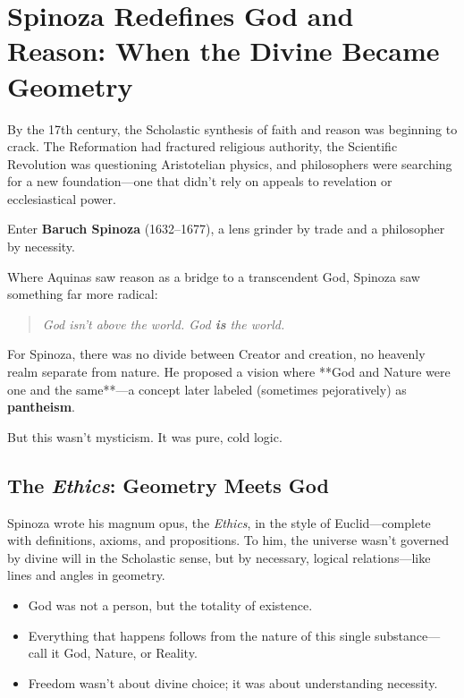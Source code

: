 \section{Spinoza Redefines God and Reason: When the Divine Became Geometry}

By the 17th century, the Scholastic synthesis of faith and reason was beginning to crack. The Reformation had fractured religious authority, the Scientific Revolution was questioning Aristotelian physics, and philosophers were searching for a new foundation—one that didn’t rely on appeals to revelation or ecclesiastical power.

Enter \textbf{Baruch Spinoza} (1632–1677), a lens grinder by trade and a philosopher by necessity.

Where Aquinas saw reason as a bridge to a transcendent God, Spinoza saw something far more radical:

\begin{quote}
\textit{God isn’t above the world. God \textbf{is} the world.}
\end{quote}

For Spinoza, there was no divide between Creator and creation, no heavenly realm separate from nature. He proposed a vision where **God and Nature were one and the same**—a concept later labeled (sometimes pejoratively) as \textbf{pantheism}.

But this wasn’t mysticism. It was pure, cold logic.

\subsection*{The \textit{Ethics}: Geometry Meets God}

Spinoza wrote his magnum opus, the \textit{Ethics}, in the style of Euclid—complete with definitions, axioms, and propositions. To him, the universe wasn’t governed by divine will in the Scholastic sense, but by necessary, logical relations—like lines and angles in geometry.

\begin{itemize}
    \item God was not a person, but the totality of existence.
    \item Everything that happens follows from the nature of this single substance—call it God, Nature, or Reality.
    \item Freedom wasn’t about divine choice; it was about understanding necessity.
\end{itemize}


